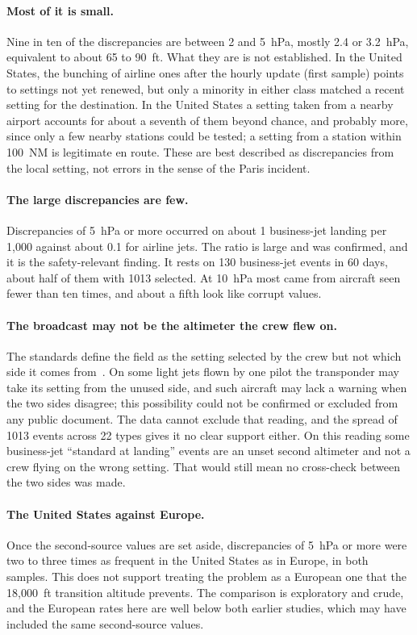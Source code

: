 \documentclass[11pt]{article}
\begin{document}
\paragraph{Most of it is small.} Nine in ten of the discrepancies are between 2 and 5~hPa, mostly 2.4 or 3.2~hPa, equivalent to about 65 to 90~ft. What they are is not established. In the United States, the bunching of airline ones after the hourly update (first sample) points to settings not yet renewed, but only a minority in either class matched a recent setting for the destination. In the United States a setting taken from a nearby airport accounts for about a seventh of them beyond chance, and probably more, since only a few nearby stations could be tested; a setting from a station within 100~NM is legitimate en route. These are best described as discrepancies from the local setting, not errors in the sense of the Paris incident.

\paragraph{The large discrepancies are few.} Discrepancies of 5~hPa or more occurred on about 1 business-jet landing per 1{,}000 against about 0.1 for airline jets. The ratio is large and was confirmed, and it is the safety-relevant finding. It rests on 130 business-jet events in 60 days, about half of them with 1013 selected. At 10~hPa most came from aircraft seen fewer than ten times, and about a fifth look like corrupt values.

\paragraph{The broadcast may not be the altimeter the crew flew on.} The standards define the field as the setting selected by the crew but not which side it comes from~\cite{eurocontrol2024}. On some light jets flown by one pilot the transponder may take its setting from the unused side, and such aircraft may lack a warning when the two sides disagree; this possibility could not be confirmed or excluded from any public document. The data cannot exclude that reading, and the spread of 1013 events across 22 types gives it no clear support either. On this reading some business-jet ``standard at landing'' events are an unset second altimeter and not a crew flying on the wrong setting. That would still mean no cross-check between the two sides was made.

\paragraph{The United States against Europe.} Once the second-source values are set aside, discrepancies of 5~hPa or more were two to three times as frequent in the United States as in Europe, in both samples. This does not support treating the problem as a European one that the 18{,}000~ft transition altitude prevents. The comparison is exploratory and crude, and the European rates here are well below both earlier studies, which may have included the same second-source values.
\end{document}
